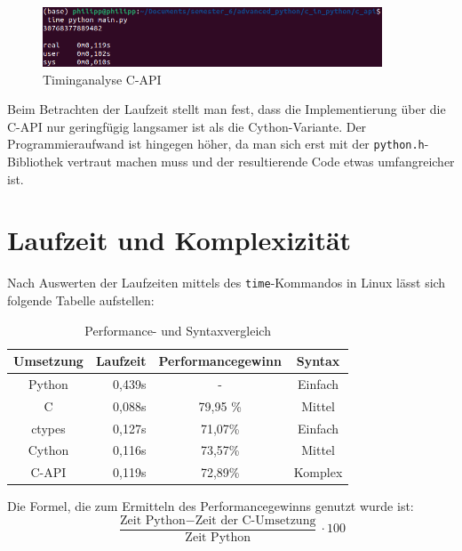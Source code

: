 \documentclass[a4paper, parskip=half]{scrartcl}
\begin{document}
\begin{figure}[H]
    \centering
    \includegraphics[width=0.9\textwidth]{c_api/timing_c_api.png}
    \caption{Timinganalyse C-API}
    \label{fig:timing_c_api}
\end{figure}

Beim Betrachten der Laufzeit stellt man fest, dass die Implementierung über die C-API nur geringfügig langsamer ist als die Cython-Variante. Der Programmieraufwand ist hingegen höher, da man sich erst mit der \lstinline{python.h}-Bibliothek vertraut machen muss und der resultierende Code etwas umfangreicher ist. 

\section{Laufzeit und Komplexizität}

Nach Auswerten der Laufzeiten mittels des \lstinline{time}-Kommandos in Linux lässt sich folgende Tabelle aufstellen:

\begin{table}[H]
    \centering
    \begin{tabular}{|c|r|c|c|}\hline
         Umsetzung  & Laufzeit & Performancegewinn &  Syntax  \\\hline\hline
         Python     & 0,439s                                &  -        & Einfach \\
         C          & 0,088s                                & 79,95 \% & Mittel \\\hline
         ctypes     & 0,127s                                & 71,07\% & \color{green} Einfach\color{black} \\
         Cython     & \color{green}0,116s\color{black}      & \color{green}73,57\%\color{black} & Mittel \\
         C-API      & 0,119s                                & 72,89\% & Komplex \\\hline
    \end{tabular}    
    \caption{Performance- und Syntaxvergleich}
    \label{tab:performance and syntax comparison}
\end{table}

Die Formel, die zum Ermitteln des Performancegewinns genutzt wurde ist:
\begin{equation}
    \frac{\text{Zeit Python} - \text{Zeit der C-Umsetzung}}{\text{Zeit Python}} \cdot 100
\end{equation}
\end{document}

